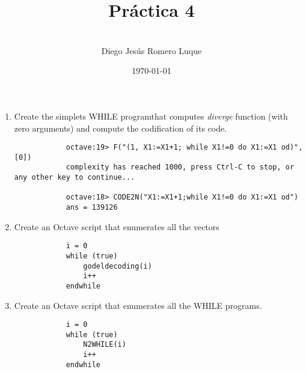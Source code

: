 \documentclass{article}
\title{\textbf{Pr\'actica 4}}
\author{\\Diego Jes\'us Romero Luque}
\date{\today}
\begin{document}
\maketitle
\pagebreak
\begin{enumerate}
    \item Create the simplets WHILE programthat computes \textit{diverge} function 
        (with zero arguments) and compute the codification of its code.
        \begin{verbatim}
            octave:19> F("(1, X1:=X1+1; while X1!=0 do X1:=X1 od)", [0])
            complexity has reached 1000, press Ctrl-C to stop, or any other key to continue...
            
            octave:18> CODE2N("X1:=X1+1;while X1!=0 do X1:=X1 od")
            ans = 139126
        \end{verbatim}
    \item Create an Octave script that enumerates all the vectors
        \begin{verbatim}
            i = 0
            while (true)
                godeldecoding(i)
                i++
            endwhile
        \end{verbatim}
    \item Create an Octave script that enumerates all the WHILE programs.
        \begin{verbatim}
            i = 0
            while (true)
                N2WHILE(i)
                i++
            endwhile
        \end{verbatim}
    \end{enumerate}
\end{document}
